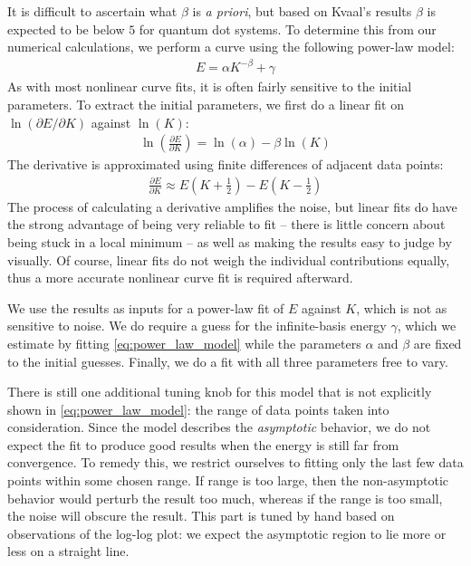 It is difficult to ascertain what $\beta$ is \textit{a priori}, but based on Kvaal's results $\beta$ is expected to be below $5$ for quantum dot systems.  To determine this from our numerical calculations, we perform a curve using the following power-law model:
\begin{align} \label{eq:power_law_model}
  E = \alpha K^{-\beta} + \gamma
\end{align}
As with most nonlinear curve fits, it is often fairly sensitive to the initial parameters.  To extract the initial parameters, we first do a linear fit on $\ln (\partial E / \partial K)$ against $\ln (K)$:
\begin{align*}
  \ln \left(\frac{\partial E}{\partial K}\right) = \ln(\alpha) - \beta \ln(K)
\end{align*}
The derivative is approximated using finite differences of adjacent data points:
\begin{align*}
  \frac{\partial E}{\partial K} \approx E\left(K + \frac{1}{2}\right) - E\left(K - \frac{1}{2}\right)
\end{align*}
The process of calculating a derivative amplifies the noise, but linear fits do have the strong advantage of being very reliable to fit -- there is little concern about being stuck in a local minimum -- as well as making the results easy to judge by visually.  Of course, linear fits do not weigh the individual contributions equally, thus a more accurate nonlinear curve fit is required afterward.

We use the results as inputs for a power-law fit of $E$ against $K$, which is not as sensitive to noise.  We do require a guess for the infinite-basis energy $\gamma$, which we estimate by fitting \eqref{eq:power_law_model} while the parameters $\alpha$ and $\beta$ are fixed to the initial guesses.  Finally, we do a fit with all three parameters free to vary.

There is still one additional tuning knob for this model that is not explicitly shown in \eqref{eq:power_law_model}: the range of data points taken into consideration.  Since the model describes the \emph{asymptotic} behavior, we do not expect the fit to produce good results when the energy is still far from convergence.  To remedy this, we restrict ourselves to fitting only the last few data points within some chosen range.  If range is too large, then the non-asymptotic behavior would perturb the result too much, whereas if the range is too small, the noise will obscure the result.  This part is tuned by hand based on observations of the log-log plot: we expect the asymptotic region to lie more or less on a straight line.

